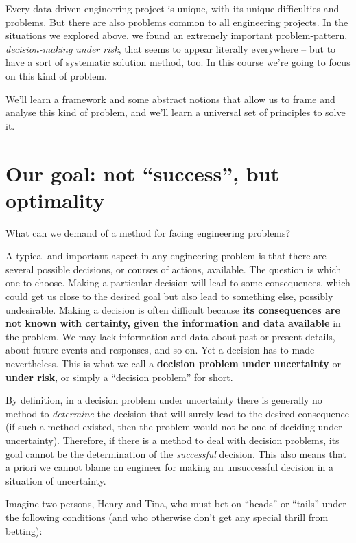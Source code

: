\documentclass[
  a4paper,
  DIV=11,
  numbers=noendperiod,
  oneside]{scrreprt}
\begin{document}
Every data-driven engineering project is unique, with its unique
difficulties and problems. But there are also problems common to all
engineering projects. In the situations we explored above, we found an
extremely important problem-pattern, \emph{decision-making under risk},
that seems to appear literally everywhere -- but to have a sort of
systematic solution method, too. In this course we're going to focus on
this kind of problem.

We'll learn a framework and some abstract notions that allow us to frame
and analyse this kind of problem, and we'll learn a universal set of
principles to solve it.

\hypertarget{our-goal-not-success-but-optimality}{%
\section{Our goal: not ``success'', but
optimality}\label{our-goal-not-success-but-optimality}}

What can we demand of a method for facing engineering problems?

A typical and important aspect in any engineering problem is that there
are several possible decisions, or courses of actions, available. The
question is which one to choose. Making a particular decision will lead
to some consequences, which could get us close to the desired goal but
also lead to something else, possibly undesirable. Making a decision is
often difficult because \textbf{its consequences are not known with
certainty, given the information and data available} in the problem. We
may lack information and data about past or present details, about
future events and responses, and so on. Yet a decision has to made
nevertheless. This is what we call a {\textbf{decision problem under
uncertainty}} or {\textbf{under risk}}, or simply a ``decision problem''
for short.

By definition, in a decision problem under uncertainty there is
generally no method to \emph{determine} the decision that will surely
lead to the desired consequence (if such a method existed, then the
problem would not be one of deciding under uncertainty). Therefore, if
there is a method to deal with decision problems, its goal cannot be the
determination of the \emph{successful} decision. This also means that a
priori we cannot blame an engineer for making an unsuccessful decision
in a situation of uncertainty.

Imagine two persons, Henry and Tina, who must bet on ``heads'' or
``tails'' under the following conditions (and who otherwise don't get
any special thrill from betting):
\end{document}
